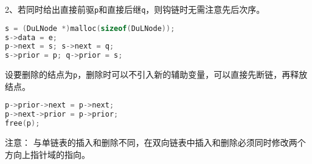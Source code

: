 \begin{frame}[fragile]
2、若同时给出直接前驱{\tt p}和直接后继{\tt q}，则钩链时无需注意先后次序。
\begin{lstlisting}[language=C,basicstyle=\ttfamily]
s = (DuLNode *)malloc(sizeof(DuLNode));
s->data = e;
p->next = s; s->next = q;
s->prior = p; q->prior = s;
\end{lstlisting}
 

\end{frame}


\begin{frame}[fragile]
设要删除的结点为{\tt p}，删除时可以不引入新的辅助变量，可以直接先断链，再释放结点。
\begin{lstlisting}[language=C,basicstyle=\ttfamily]
p->prior->next = p->next;
p->next->prior = p->prior;
free(p);
\end{lstlisting}
\pause

\textcolor{acolor5}{注意：}
与单链表的插入和删除不同，在双向链表中插入和删除必须同时修改两个方向上指针域的指向。

\end{frame}